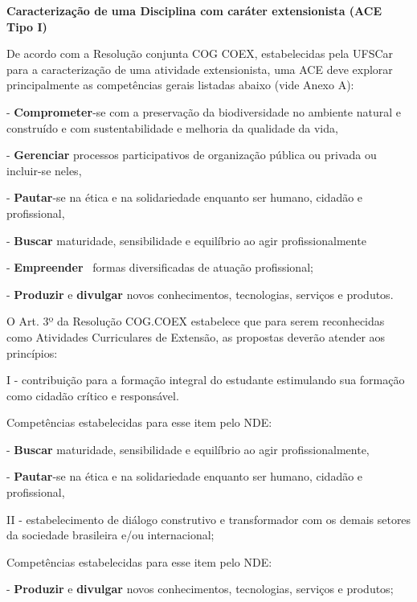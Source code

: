 \bigskip


\textbf{Caracterização de uma Disciplina com caráter extensionista (ACE Tipo I)}


\bigskip

De acordo com a Resolução conjunta COG COEX, estabelecidas pela UFSCar para a caracterização de uma atividade
extensionista, uma ACE deve explorar principalmente as competências gerais listadas abaixo (vide Anexo A): \ 

{}- \textbf{Comprometer}{}-se com a preservação da biodiversidade no ambiente natural e construído e com
sustentabilidade e melhoria da qualidade da vida, 

{}- \textbf{Gerenciar} processos participativos de organização pública ou privada ou incluir-se neles, 

{}- \textbf{Pautar}{}-se na ética e na solidariedade enquanto ser humano, cidadão e profissional, 

{}- \textbf{Buscar} maturidade, sensibilidade e equilíbrio ao agir profissionalmente

{}- \textbf{Empreender }\ formas diversificadas de atuação profissional;

{}- \textbf{Produzir }e \textbf{divulgar }novos conhecimentos, tecnologias, serviços e produtos. 


\bigskip

O Art. 3º da Resolução COG.COEX estabelece que para serem reconhecidas como Atividades Curriculares de Extensão, as
propostas deverão atender aos princípios:


\bigskip

I - contribuição para a formação integral do estudante estimulando sua formação como cidadão crítico e responsável.

Competências estabelecidas para esse item pelo NDE:

{}- \textbf{Buscar} maturidade, sensibilidade e equilíbrio ao agir profissionalmente, 

{}- \textbf{Pautar}{}-se na ética e na solidariedade enquanto ser humano, cidadão e profissional, 


\bigskip

II - estabelecimento de diálogo construtivo e transformador com os demais setores da sociedade brasileira e/ou
internacional;

Competências estabelecidas para esse item pelo NDE:

{}- \textbf{Produzir }e \textbf{divulgar }novos conhecimentos, tecnologias, serviços e produtos;

